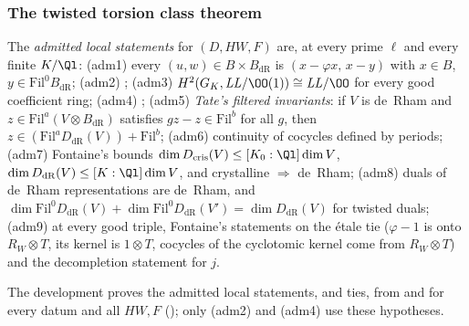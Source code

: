 \subsubsection{The twisted torsion class theorem}

\begin{definition}\label{pf:sh-hodge:def-adm}
The \emph{admitted local statements} for $(D,HW,F)$ are, at every prime $\ell$ and every finite $K/\Ql$: (adm1) every $(u,w)\in B\times
B_{\mathrm{dR}}$ is $(x-\varphi x,\,x-y)$ with $x\in B$, $y\in\mathrm{Fil}^0B_{\mathrm{dR}}$; (adm2) \shhodgeLTD; (adm3) $H^2(G_K,\mathit{LL}/\OO(1))\cong
\mathit{LL}/\OO$ for every good coefficient ring; (adm4) \shhodgeLEC; (adm5) \emph{Tate's filtered invariants}: if $V$ is de~Rham and
$z\in\mathrm{Fil}^a(V\otimes B_{\mathrm{dR}})$ satisfies $gz-z\in\mathrm{Fil}^b$ for all $g$, then $z\in(\mathrm{Fil}^aD_{\mathrm{dR}}(V))+\mathrm{Fil}^b$;
(adm6) continuity of cocycles defined by periods; (adm7) Fontaine's bounds $\dim D_{\mathrm{cris}}(V)\le[K_0:\Ql]\dim V$, $\dim D_{\mathrm{dR}}(V)\le
[K:\Ql]\dim V$, and crystalline $\Rightarrow$ de~Rham; (adm8) duals of de~Rham representations are de~Rham, and $\dim\mathrm{Fil}^0D_{\mathrm{dR}}(V)
+\dim\mathrm{Fil}^0D_{\mathrm{dR}}(V')=\dim D_{\mathrm{dR}}(V)$ for twisted duals; (adm9) at every good triple, Fontaine's statements on the \'etale tie
($\varphi-1$ is onto $R_W\otimes T$, its kernel is $1\otimes T$, cocycles of the cyclotomic kernel come from $R_W\otimes T$) and the
decompletion statement for $j$.
\end{definition}

The development proves the admitted local statements, and ties, from \shhodgeLTD{} and \shhodgeLEC{} for every datum and all $HW,F$
(); only (adm2) and (adm4) use these hypotheses.

